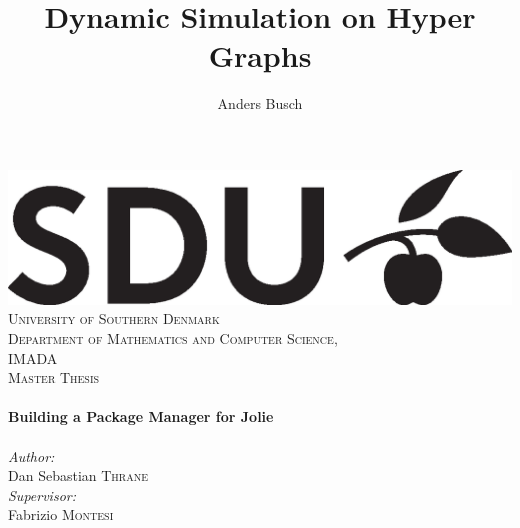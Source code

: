 \documentclass[11pt, a4paper]{report} %
\title{Dynamic Simulation on Hyper Graphs}
\author{Anders Busch}
\begin{document}
\begin{titlepage}

\newcommand{\HRule}{\rule{\linewidth}{0.5mm}} %

\flushright %
%
\includegraphics[scale=0.35,bb=0 0 250 0]{pictures/SDU_logo.eps}\\[1cm] %


\textsc{\LARGE University of Southern Denmark}\\%
\textsc{\normalsize Department of Mathematics and Computer Science,\\ IMADA}\\[2.6cm]

\textsc{\Large Master Thesis}\\[0.5cm]
\hfill \\%
{ \Huge \bfseries Building a Package Manager for Jolie }\\[0.4cm] %
\hfill \\[2.8cm]

\large
\emph{Author:}\\
Dan Sebastian \textsc{Thrane} %
\\[0.8cm]
\large
\emph{Supervisor:} \\
Fabrizio \textsc{Montesi} %



\end{titlepage}
\end{document}

